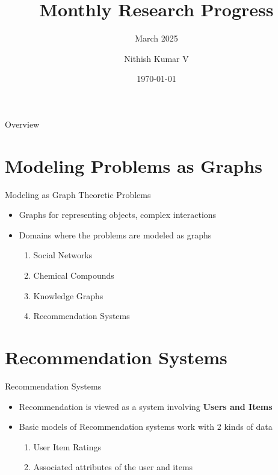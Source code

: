 \documentclass[aspectratio=169,xcolor=dvipsnames]{beamer}
\title{Monthly Research Progress}
\subtitle{March 2025}
\author{Nithish Kumar V}
\institute
{
	Department of Computer Science and Engineering \\
	Indian Institute of Information Technology, Design and Manufacturing, Kancheepuram
}
\date{\today}
\begin{document}
	
	\begin{frame}
		\titlepage
	\end{frame}
	
	\begin{frame}{Overview}
		\tableofcontents
	\end{frame}
	\section{Modeling Problems as Graphs}
	\begin{frame}{Modeling as Graph Theoretic Problems}
		\begin{itemize}
			\item Graphs for representing objects, complex interactions
			
			\item Domains where the problems are modeled as graphs
			\begin{enumerate}
				\item Social Networks
				\item Chemical Compounds
				\item Knowledge Graphs
				\item Recommendation Systems
			\end{enumerate}
		\end{itemize}
	\end{frame}
	\section{Recommendation Systems}
	
	\begin{frame}{Recommendation Systems}
		\begin{itemize}
			\item Recommendation is viewed as a system involving  \textbf{Users and Items}
			\item Basic models of Recommendation systems work with 2 kinds of data 
			\begin{enumerate}
				\item User Item Ratings
				\item Associated attributes of the user and items
			\end{enumerate}
			
			 
		\end{itemize}
	\end{frame}
	
\end{document}
